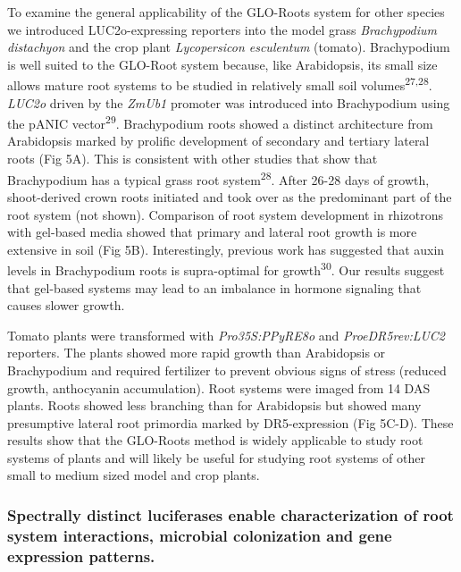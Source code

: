 \documentclass[]{article}
\begin{document}
To examine the general applicability of the GLO-Roots system for other
species we introduced LUC2o-expressing reporters into the model grass
\emph{Brachypodium distachyon} and the crop plant \emph{Lycopersicon
esculentum} (tomato). Brachypodium is well suited to the GLO-Root system
because, like Arabidopsis, its small size allows mature root systems to
be studied in relatively small soil volumes\textsuperscript{27,28}.
\emph{LUC2o} driven by the \emph{ZmUb1} promoter was introduced into
Brachypodium using the pANIC vector\textsuperscript{29}. Brachypodium
roots showed a distinct architecture from Arabidopsis marked by prolific
development of secondary and tertiary lateral roots (Fig 5A). This is
consistent with other studies that show that Brachypodium has a typical
grass root system\textsuperscript{28}. After 26-28 days of growth,
shoot-derived crown roots initiated and took over as the predominant
part of the root system (not shown). Comparison of root system
development in rhizotrons with gel-based media showed that primary and
lateral root growth is more extensive in soil (Fig 5B). Interestingly,
previous work has suggested that auxin levels in Brachypodium roots is
supra-optimal for growth\textsuperscript{30}. Our results suggest that
gel-based systems may lead to an imbalance in hormone signaling that
causes slower growth.

Tomato plants were transformed with \emph{Pro35S:PPyRE8o} and
\emph{ProeDR5rev:LUC2} reporters. The plants showed more rapid growth
than Arabidopsis or Brachypodium and required fertilizer to prevent
obvious signs of stress (reduced growth, anthocyanin accumulation). Root
systems were imaged from 14 DAS plants. Roots showed less branching than
for Arabidopsis but showed many presumptive lateral root primordia
marked by DR5-expression (Fig 5C-D). These results show that the
GLO-Roots method is widely applicable to study root systems of plants
and will likely be useful for studying root systems of other small to
medium sized model and crop plants.

\subsubsection{Spectrally distinct luciferases enable characterization
of root system interactions, microbial colonization and gene expression
patterns.}\label{spectrally-distinct-luciferases-enable-characterization-of-root-system-interactions-microbial-colonization-and-gene-expression-patterns.}
\end{document}
